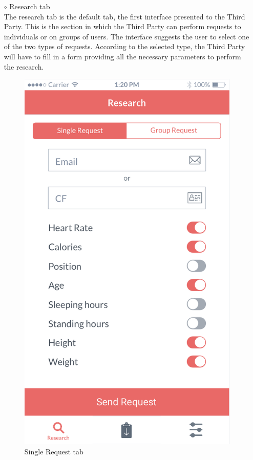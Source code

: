 \documentclass[titlepage]{article}
\begin{document}
\begin{itemize}
\begin{itemize}
\begin{itemize}
					\item[$\circ$] Research tab \\
				The research tab is the default tab, the first interface presented to the Third Party. This is the section in which the Third Party can perform requests to individuals or on groups of users. The interface suggests the user to select one of the two types of requests. According to the selected type, the Third Party will have to fill in a form providing all the necessary parameters to perform the research.\\
					\begin{figure}[H]
						\center
  						\includegraphics[width=0.5\columnwidth]{Mockup/mockupSingleRequest.png}
  						\caption{Single Request tab}
 					 	\label{fig:SRtab}
					\end{figure}


\end{itemize}
\end{itemize}
\end{itemize}
\end{document}
